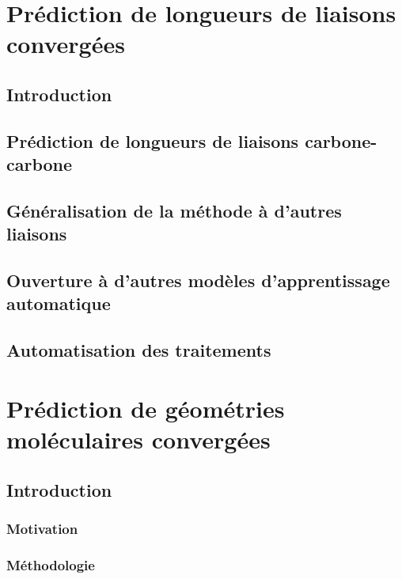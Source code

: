 \documentclass{report}
\begin{document}
\chapter{Prédiction de longueurs de liaisons convergées}
	\label{dist_rel_chap}

	\section{Introduction}
		
	\section{Prédiction de longueurs de liaisons carbone-carbone}
		
	\section{Généralisation de la méthode à d'autres liaisons}
		
	\section{Ouverture à d'autres modèles d'apprentissage automatique}
		
	\section{Automatisation des traitements}
		
		


\chapter{Prédiction de géométries moléculaires convergées}
	\label{delta_dist_chap}

	\section{Introduction}
		\subsection{Motivation}
			
		\subsection{Méthodologie}
			
\end{document}
